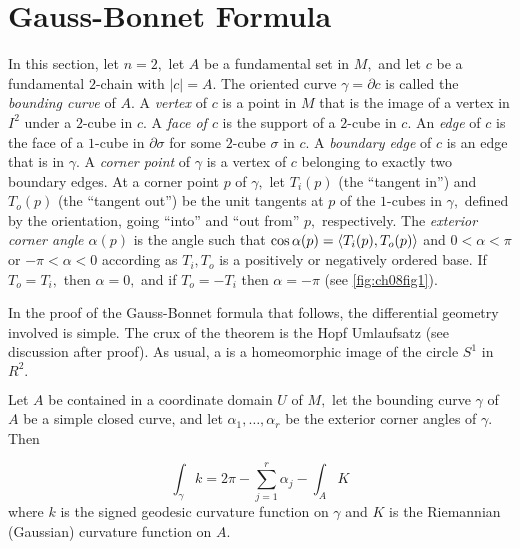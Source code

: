 \documentclass[../main]{subfiles}
\begin{document}
\section{Gauss-Bonnet Formula}\label{ch08:s1}
In this section, let $n=2,$ let $A$ be a fundamental set in $M,$ and let $c$ be a fundamental $2$-chain with $|c|=A.$ The oriented curve $\gamma=\partial c$ is called the \emph{bounding curve} of $A.$ A \emph{vertex} of $c$ is a point in $M$ that is the image of a vertex in $I^2$ under a $2$-cube in $c.$ A \emph{face of $c$} is the support of a $2$-cube in $c.$ An \emph{edge} of $c$ is the face of a $1$-cube in $\partial \sigma$ for some $2$-cube $\sigma$ in $c.$ A \emph{boundary edge} of $c$ is an edge that is in $\gamma.$ A \emph{corner point} of $\gamma$ is a vertex of $c$ belonging to exactly two boundary edges. At a corner point $p$ of $\gamma,$ let $T_i(p)$ (the ``tangent in'') and $T_o(p)$ (the ``tangent out'') be the unit tangents at $p$ of the $1$-cubes in $\gamma,$ defined by the orientation, going ``into'' and ``out from'' $p,$ respectively. The \emph{exterior corner angle $\alpha(p)$} is the angle such that $\cos \alpha(p) = \left\langle T_i(p), T_o(p)\right\rangle$ and $0<\alpha<\pi$ or $-\pi< \alpha < 0$ according as $T_i, T_o$ is a positively or negatively ordered base. If $T_o = T_i,$ then $\alpha=0,$ and if $T_o=-T_i$ then $\alpha=-\pi$ (see \ref{fig:ch08fig1}).



In the proof of the Gauss-Bonnet formula that follows, the differential geometry involved is simple. The crux of the theorem is the Hopf Umlaufsatz (see discussion after proof). As usual, a  is a homeomorphic image of the circle $S^1$ in $R^2.$ 



\begin{theorem} \label{thm:ch8.1.1}
Let $A$ be contained in a  coordinate domain $U$ of $M,$ let the bounding curve $\gamma$ of $A$ be a simple closed curve, and let $\alpha_1,\ldots,\alpha_r$ be the exterior corner angles of $\gamma.$ Then

\begin{equation}\tag{1}\label{eq:ch08.1}
    \int_{\gamma}k = 2\pi- \sum_{j=1}^r \alpha_j - \int_{A} K
\end{equation} where $k$ is the signed geodesic curvature function on $\gamma$ and $K$ is the Riemannian (Gaussian) curvature function on $A.$ 
\end{theorem}
\end{document}
